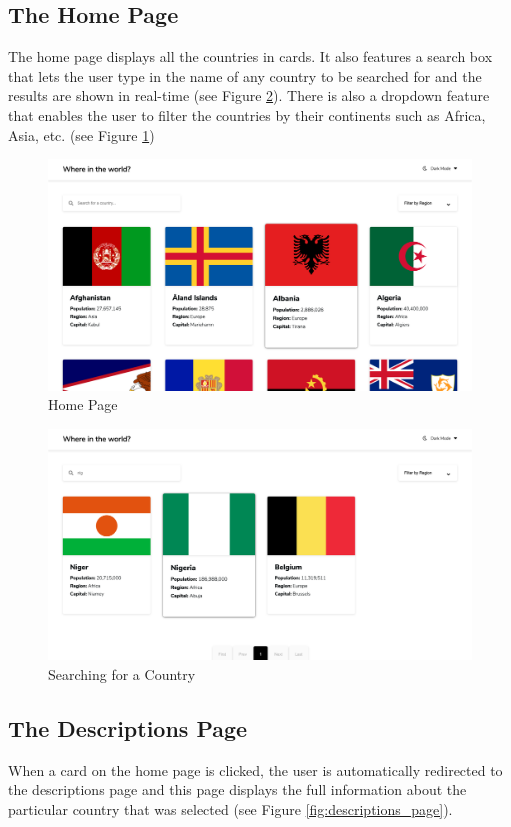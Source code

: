 \documentclass[twoside, a4paper, 12pt]{report}
\begin{document}
\subsection{The Home Page}
The home page displays all the countries in cards. It also features a search box that lets the user type in the name of any country to be searched for and the results are shown in real-time (see Figure \ref{fig:search}). There is also a dropdown feature that enables the user to filter the countries by their continents such as Africa, Asia, etc. (see Figure \ref{fig:home_page})

\begin{figure} [ht]
	\centering
	\includegraphics[width=1.0\textwidth]{Home Page.png}
	\caption{Home Page}
	\label{fig:home_page}
\end{figure}

\begin{figure}
	\centering
	\includegraphics[width=1.0\textwidth]{search.png}
	\caption{Searching for a Country}
	\label{fig:search}
\end{figure}

\subsection{The Descriptions Page}
When a card on the home page is clicked, the user is automatically redirected to the descriptions page and this page displays the full information about the particular country that was selected (see Figure \ref{fig:descriptions_page}).
\end{document}
